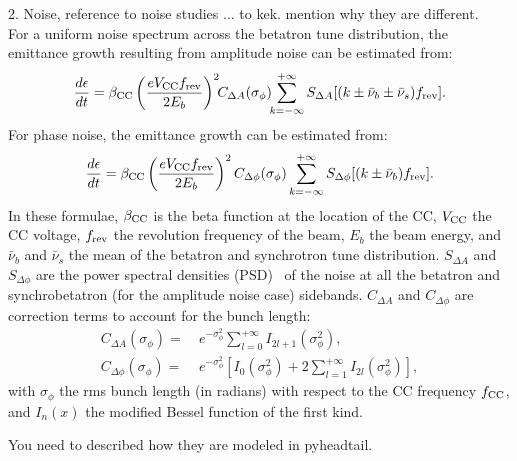 

2. Noise, reference to noise studies ... to kek. mention why they are different.\\


For a uniform noise spectrum across the betatron tune distribution, the emittance growth resulting from amplitude noise can be estimated from:
\begin{equation}\label{eq:dey_an}
    \frac{d\epsilon}{dt}  = {\beta_\mathrm{CC}} \left( \frac{e{V_\mathrm{CC}}{f_\mathrm{rev}}}{2E_b}\right)^2 \!\! C_{\Delta A} (\sigma_{\phi}) \!\! \sum_{k=-\infty}^{+\infty} S_{\Delta A}[(k \pm \bar{\nu}_b \pm \bar{\nu}_s){f_\mathrm{rev}}].
\end{equation}
For phase noise, the emittance growth can be estimated from:
\begin{equation}\label{eq:dey_pn}
    \frac{d\epsilon}{dt}  = {\beta_\mathrm{CC}} \left( \frac{e{V_\mathrm{CC}}{f_\mathrm{rev}}}{2E_b}\right)^2 C_{\Delta \phi} (\sigma_{\phi}) \sum_{k=-\infty}^{+\infty} S_{\Delta \phi}[(k \pm \bar{\nu}_b){f_\mathrm{rev}}].
\end{equation}
 In these formulae, ${\beta_\mathrm{CC}}$ is the beta function at the location of the CC, ${V_\mathrm{CC}}$ the CC voltage, ${f_\mathrm{rev}}$ the revolution frequency of the beam, $E_b$ the beam energy, and $\bar{\nu}_b$ and $\bar{\nu}_s$ the mean of the betatron and synchrotron tune distribution. $S_{\Delta A}$ and $S_{\Delta \phi}$ are the power spectral densities (PSD)~\cite{b_papoulis1991probability} of the noise at all the betatron and synchrobetatron (for the amplitude noise case) sidebands. %
 $C_{\Delta A}$ and $C_{\Delta \phi}$ are correction terms to account for the bunch length:
\begin{align}
C_{\Delta A}(\sigma_{\phi}) = ~& e^{-\sigma_{\phi}^2}\sum_{l=0}^{+\infty} I_{2l+1}(\sigma_{\phi}^2),\\
C_{\Delta \phi}(\sigma_{\phi}) = ~& e^{-\sigma_{\phi}^2} \left[I_0(\sigma_{\phi}^2) + 2 \sum_{l=1}^{+\infty} I_{2l}(\sigma_{\phi}^2) \right],
\end{align}
with $\sigma_{\phi}$ the rms bunch length (in radians) with respect to the CC frequency ${f_\mathrm{CC}}$, and $I_n(x)$ the modified Bessel function of the first kind. 


You need to described how they are modeled in pyheadtail.
